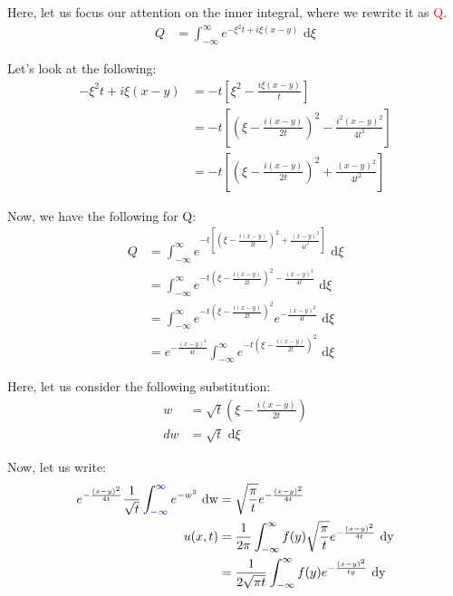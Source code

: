 \begin{enumerate}
  Here, let us focus our attention on the inner integral, where we rewrite it as \textcolor{red}{Q}.
  \begin{align}
    Q & = \int^\infty_{-\infty} e^{-\xi^2 t + i\xi(x - y)} \text{ d}\xi
  \end{align}

  Let's look at the following:
  \begin{align}
    -\xi^2 t + i\xi(x - y) & = -t\left[ \xi^2 - \frac{i \xi(x - y)}{t}\right]\\
    & = -t \left[ \left(\xi - \frac{i(x - y)}{2t}\right)^2 - \frac{i^2(x - y)^2}{4t^2} \right]\\
    & = -t \left[ \left(\xi - \frac{i(x - y)}{2t}\right)^2 + \frac{(x - y)^2}{4t^2} \right]
  \end{align}

  Now, we have the following for Q:
  \begin{align}
    Q & = \int^\infty_{-\infty} e^{-t \left[ \left(\xi - \frac{i(x - y)}{2t}\right)^2 + \frac{(x - y)^2}{4t^2} \right]} \text{ d}\xi\\
    & = \int^\infty_{-\infty} e^{-t\left( \xi - \frac{i(x - y)}{2t}\right)^2 - \frac{(x - y)^2}{4t}} \text{ d}\xi\\
    & = \int^\infty_{-\infty} e^{-t \left(\xi - \frac{i(x - y)}{2t}\right)^2} e^{- \frac{(x - y)^2}{4t}} \text{ d}\xi\\
    & = e^{- \frac{(x - y)^2}{4t}} \int^\infty_{-\infty} e^{-t \left(\xi - \frac{i(x - y)}{2t}\right)^2} \text{ d}\xi
  \end{align}

  Here, let us consider the following substitution:
  \color{blue}
  \begin{align}
    w & = \sqrt t \left( \xi - \frac{i(x - y)}{2t}\right)\\
    dw & = \sqrt t \text{ d}\xi
  \end{align}
  \color{black}

  Now, let us write:
  \begin{align}
    e^{- \frac{(x - y)^2}{4t}} \frac{1}{\sqrt t} \int^{\textcolor{blue}{\infty}}_{\textcolor{blue}{-\infty}} e^{-w^2} \text{ dw}
    & = \sqrt{\frac{\pi}{t}} e^{- \frac{(x - y)^2}{4t}}\\
    u(x, t) & = \frac{1}{2 \pi} \int^\infty_{- \infty} f(y) \sqrt{\frac{\pi}{t}} e^{- \frac{(x - y)^2}{4t}} \text{ dy}\\
    & = \frac{1}{2 \sqrt{\pi t}} \int^\infty_{-\infty} f(y) e^{- \frac{(x - y)^2}{ty}} \text{ dy}
  \end{align}
\end{enumerate}

\hrulefill
